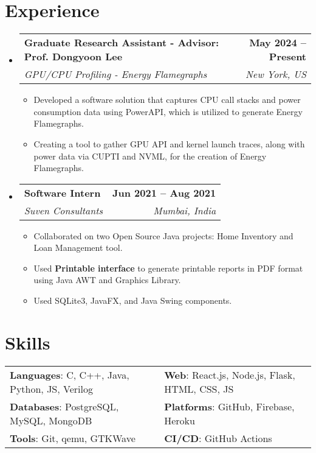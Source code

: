 \documentclass[letterpaper,11pt]{article}
\makeatletter
\newcommand{\resumeItem}[1]{
  \item\small{
    {#1 \vspace{-2pt}}
  }
}
\newcommand{\resumeSubheading}[4]{
  \vspace{-2pt}\item
    \begin{tabular*}{1.0\textwidth}[t]{l@{\extracolsep{\fill}}r}
      \vspace{-2pt}\textbf{#1} & \textbf{\small #2} \\
      \textit{\small#3} & \textit{\small #4} \\
    \end{tabular*}\vspace{-7pt}
}
\newcommand{\resumeSubHeadingListStart}{\begin{itemize}[leftmargin=0.0in, label={}]}
\newcommand{\resumeSubHeadingListEnd}{\end{itemize}}
\newcommand{\resumeItemListStart}{\begin{itemize}}
\newcommand{\resumeItemListEnd}{\end{itemize}\vspace{-5pt}}
\makeatother
\begin{document}
\section{Experience}
    \resumeSubHeadingListStart
    \vspace{-2pt}

            \resumeSubheading
            {Graduate Research Assistant - Advisor: Prof. Dongyoon Lee}{May 2024 -- Present}
            {GPU/CPU Profiling - Energy Flamegraphs}{New York, US}
            \resumeItemListStart
                \resumeItem{Developed a software solution that captures CPU call stacks and power consumption data using PowerAPI, which is utilized to generate Energy Flamegraphs.}
                \resumeItem{Creating a tool to gather GPU API and kernel launch traces, along with power data via CUPTI and NVML, for the creation of Energy Flamegraphs.}
            \resumeItemListEnd
        \vspace{-3pt}
        
        \resumeSubheading
            {Software Intern}{Jun 2021 -- Aug 2021}
            {Suven Consultants}{Mumbai, India}
            \resumeItemListStart
                \resumeItem{Collaborated on two Open Source Java projects: Home Inventory and Loan Management tool.}
                \resumeItem{Used \textbf{Printable interface} to generate printable reports in PDF format using Java AWT and Graphics Library.}
                \resumeItem{Used SQLite3, JavaFX, and Java Swing components.}
            \resumeItemListEnd
        \vspace{-3pt}
    \resumeSubHeadingListEnd
\vspace{-18pt}



\section{Skills}
    \vspace{-4pt}
    \begin{itemize}[leftmargin=0.2in, label={}]
        {\item{
            \begin{tabular}{ l@{\hskip 0.2in} l }
                 \textbf{Languages}: C, C++, Java, Python, JS, Verilog & \textbf{Web}: React.js, Node.js, Flask, HTML, CSS, JS  \\ 
                 \textbf{Databases}: PostgreSQL, MySQL, MongoDB & \textbf{Platforms}: GitHub, Firebase, Heroku \\  
                 \textbf{Tools}: Git, qemu, GTKWave & \textbf{CI/CD}: GitHub Actions
            \end{tabular}
        }}
    \end{itemize}
\vspace{-22pt}
\end{document}
